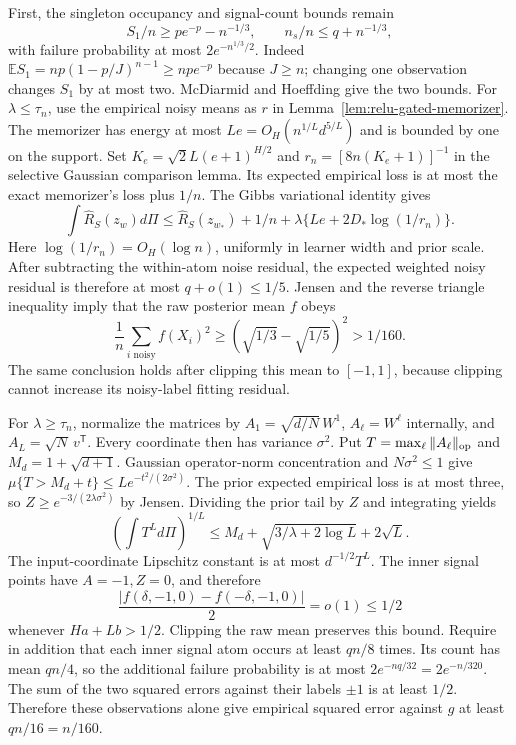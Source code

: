First, the singleton occupancy and signal-count bounds remain
\[
 S_1/n\ge pe^{-p}-n^{-1/3},\qquad
 n_s/n\le q+n^{-1/3},
\]
with failure probability at most $2e^{-n^{1/3}/2}$. Indeed
$\mathbb E S_1=np(1-p/J)^{n-1}\ge npe^{-p}$ because $J\ge n$;
changing one observation changes $S_1$ by at most two. McDiarmid and
Hoeffding give the two bounds.
For $\lambda\le\tau_n$, use the empirical noisy means as $r$ in
Lemma~\ref{lem:relu-gated-memorizer}. The memorizer has energy at
most $Le=O_H(n^{1/L}d^{5/L})$ and is bounded by one on the support.
Set $K_e=\sqrt2 L(e+1)^{H/2}$ and
$r_n=[8n(K_e+1)]^{-1}$ in the selective Gaussian comparison lemma.
Its expected empirical loss is at most the exact memorizer's loss
plus $1/n$. The Gibbs variational identity gives
\[
 \int\widehat R_S(z_w)d\Pi
 \le\widehat R_S(z_{w_*})+1/n
       +\lambda\{Le+2D_*\log(1/r_n)\}.
\]
Here $\log(1/r_n)=O_H(\log n)$, uniformly in learner width and
prior scale. After subtracting the within-atom noise residual,
the expected weighted noisy residual is therefore at most
$q+o(1)\le1/5$.
Jensen and the reverse triangle inequality imply that the raw
posterior mean $f$ obeys
\[
 \frac1n\sum_{i\text{ noisy}}f(X_i)^2
 \ge\left(\sqrt{1/3}-\sqrt{1/5}\right)^2>1/160.
\]
The same conclusion holds after clipping this mean to $[-1,1]$,
because clipping cannot increase its noisy-label fitting residual.

For $\lambda\ge\tau_n$, normalize the matrices by
$A_1=\sqrt{d/N}\,W^1$, $A_\ell=W^\ell$ internally, and
$A_L=\sqrt N\,v^{\mathsf T}$. Every coordinate then has variance
$\sigma^2$. Put $T=\max_\ell\|A_\ell\|_{\rm op}$ and
$M_d=1+\sqrt{d+1}$. Gaussian operator-norm concentration and
$N\sigma^2\le1$ give
$\mu\{T>M_d+t\}\le L e^{-t^2/(2\sigma^2)}$.
The prior expected empirical loss is at most three, so
$Z\ge e^{-3/(2\lambda\sigma^2)}$ by Jensen. Dividing the prior
tail by $Z$ and integrating yields
\[
 \left(\int T^L d\Pi\right)^{1/L}
 \le M_d+\sqrt{3/\lambda+2\log L}+2\sqrt L.
\]
The input-coordinate Lipschitz constant is at most $d^{-1/2}T^L$.
The inner signal points have $A=-1,Z=0$, and therefore
\[
 \frac{|f(\delta,-1,0)-f(-\delta,-1,0)|}{2}=o(1)\le1/2
\]
whenever $Ha+Lb>1/2$. Clipping the raw mean preserves this bound.
Require in addition that each inner signal atom occurs at least
$qn/8$ times. Its count has mean $qn/4$, so the additional failure
probability is at most $2e^{-nq/32}=2e^{-n/320}$.
The sum of the two squared errors against their labels $\pm1$ is
at least $1/2$. Therefore these observations alone give empirical
squared error against $g$ at least $qn/16=n/160$.

